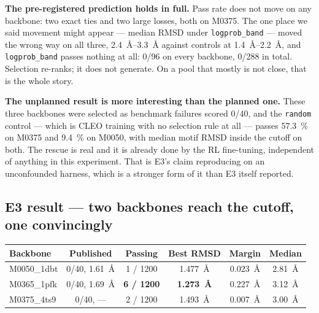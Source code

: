 \textbf{The pre-registered prediction holds in full.} Pass rate does not move on
any backbone: two exact ties and two large losses, both on M0375. The one place we said movement
might appear --- median RMSD under \texttt{logprob\_band} --- moved the wrong
way on all three, \SIrange{2.4}{3.3}{\angstrom} against controls at
\SIrange{1.4}{2.2}{\angstrom}, and \texttt{logprob\_band} passes nothing at all:
0/96 on every backbone, 0/288 in total. Selection re-ranks; it does not generate. On a
pool that mostly is not close, that is the whole story.

\textbf{The unplanned result is more interesting than the planned one.} These
three backbones were selected as benchmark failures scored 0/40, and the
\texttt{random} control --- which is CLEO training with no selection rule at all
--- passes \SI{57.3}{\percent} on M0375 and \SI{9.4}{\percent} on M0050, with
median motif RMSD inside the cutoff on both. The rescue is real and it is
already done by the RL fine-tuning, independent of anything in this experiment.
That is E3's claim reproducing on an unconfounded harness, which is a stronger
form of it than E3 itself reported.


\subsection*{E3 result --- two backbones reach the cutoff, one convincingly}


\begin{center}
\begin{tabular}{@{}lccccc@{}}
\toprule
\textbf{Backbone} & \textbf{Published} & \textbf{Passing} & \textbf{Best RMSD} &
\textbf{Margin} & \textbf{Median} \\
\midrule
M0050\_1dbt & 0/40, \SI{1.61}{\angstrom} & 1 / 1200 & \SI{1.477}{\angstrom} &
  \SI{0.023}{\angstrom} & \SI{2.81}{\angstrom} \\
M0365\_1pfk & 0/40, \SI{1.69}{\angstrom} & \textbf{6 / 1200} &
  \textbf{\SI{1.273}{\angstrom}} & \SI{0.227}{\angstrom} & \SI{3.12}{\angstrom} \\
M0375\_4ts9 & 0/40, --- & 2 / 1200 & \SI{1.493}{\angstrom} &
  \SI{0.007}{\angstrom} & \SI{3.00}{\angstrom} \\
\bottomrule
\end{tabular}
\end{center}

